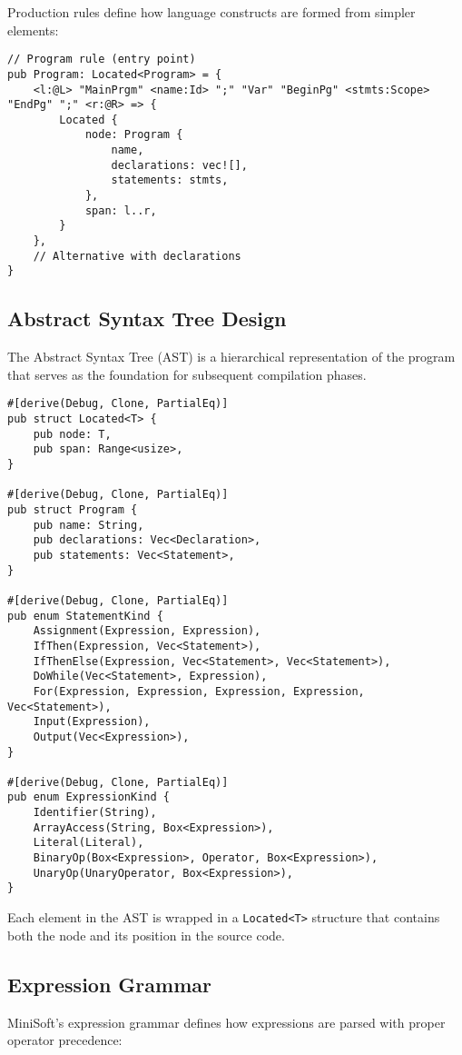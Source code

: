 \documentclass[12pt,a4paper]{article}
\begin{document}
Production rules define how language constructs are formed from simpler elements:

\begin{lstlisting}[caption={Program Rule Example}]
// Program rule (entry point)
pub Program: Located<Program> = {
    <l:@L> "MainPrgm" <name:Id> ";" "Var" "BeginPg" <stmts:Scope> "EndPg" ";" <r:@R> => {
        Located {
            node: Program {
                name,
                declarations: vec![],
                statements: stmts,
            },
            span: l..r,
        }
    },
    // Alternative with declarations
}
\end{lstlisting}

\subsection{Abstract Syntax Tree Design}
The Abstract Syntax Tree (AST) is a hierarchical representation of the program that serves as the foundation for subsequent compilation phases.

\begin{lstlisting}[caption={Core AST Structures}]
#[derive(Debug, Clone, PartialEq)]
pub struct Located<T> {
    pub node: T,
    pub span: Range<usize>,
}

#[derive(Debug, Clone, PartialEq)]
pub struct Program {
    pub name: String,
    pub declarations: Vec<Declaration>,
    pub statements: Vec<Statement>,
}

#[derive(Debug, Clone, PartialEq)]
pub enum StatementKind {
    Assignment(Expression, Expression),
    IfThen(Expression, Vec<Statement>),
    IfThenElse(Expression, Vec<Statement>, Vec<Statement>),
    DoWhile(Vec<Statement>, Expression),
    For(Expression, Expression, Expression, Expression, Vec<Statement>),
    Input(Expression),
    Output(Vec<Expression>),
}

#[derive(Debug, Clone, PartialEq)]
pub enum ExpressionKind {
    Identifier(String),
    ArrayAccess(String, Box<Expression>),
    Literal(Literal),
    BinaryOp(Box<Expression>, Operator, Box<Expression>),
    UnaryOp(UnaryOperator, Box<Expression>),
}
\end{lstlisting}

Each element in the AST is wrapped in a \texttt{Located<T>} structure that contains both the node and its position in the source code.

\subsection{Expression Grammar}
MiniSoft's expression grammar defines how expressions are parsed with proper operator precedence:
\end{document}
